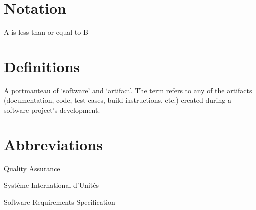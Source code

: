 \section*{Notation}
\begin{description}[font=\rmfamily\bfseries, leftmargin=3cm, style=nextline]
	\item[$A \leq B$] A is less than or equal to B
\end{description}

\section*{Definitions}
\begin{description}[font=\rmfamily\bfseries, leftmargin=3cm, style=nextline]
	\item[\SF] A portmanteau of `software' and `artifact'. The term refers to 
	any of the artifacts (documentation, code, test cases, build instructions, 
	etc.) created during a software project's development.
\end{description}

\section*{Abbreviations}
\begin{description}[font=\rmfamily\bfseries, leftmargin=3cm, style=nextline]
	\item[QA] Quality Assurance
	\item[SI] Syst\`eme International d'Unit\'es
	\item[SRS] Software Requirements Specification
\end{description}